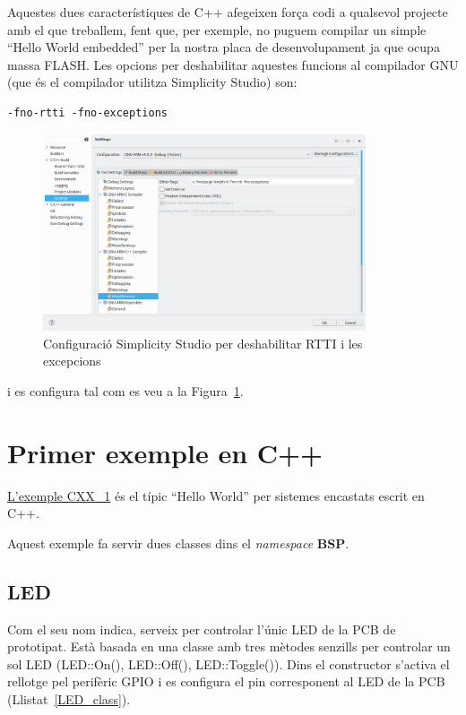 Aquestes dues característiques de C++ afegeixen força codi a qualsevol projecte amb el que treballem, fent que, per exemple, no puguem compilar un simple ``Hello World embedded'' per la nostra placa de desenvolupament ja que ocupa massa FLASH. Les opcions per deshabilitar aquestes funcions al compilador GNU (que és el compilador utilitza Simplicity Studio) son:
\begin{verbatim}
-fno-rtti -fno-exceptions
\end{verbatim}

\begin{figure}
 \centering
\includegraphics[width=0.85\textwidth, keepaspectratio]{imatges/CXX_options.png}
 \caption{Configuració Simplicity Studio per deshabilitar RTTI i les excepcions}
 \label{fig:CXX_RTT}
\end{figure}
i es configura tal com es veu a la Figura~\ref{fig:CXX_RTT}.

\section{Primer exemple en C++}
\label{sec:CXX_example}
\href{https://github.com/mariusmm/cursembedded/tree/master/Simplicity/CXX_1}{L'exemple CXX\_1} és el típic ``Hello World'' per sistemes encastats escrit en C++.

Aquest exemple fa servir dues classes dins el {\em namespace} {\bf BSP}.

\subsection{LED}
Com el seu nom indica, serveix per controlar l'únic \gls{LED} de la \gls{PCB} de prototipat. Està basada en una classe amb tres mètodes senzills per controlar un sol LED (LED::On(), LED::Off(), LED::Toggle()).
Dins el constructor s'activa el rellotge pel perifèric \gls{GPIO} i es configura el pin corresponent al LED de la PCB (Llistat~\ref{LED_class}).

